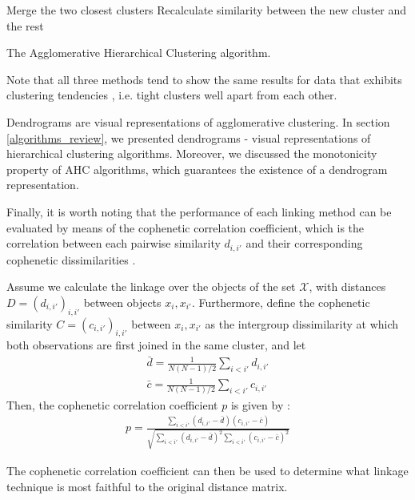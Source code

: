 \documentclass[../main.tex]{subfiles}
\begin{document}
\begin{algorithm}
\begin{algorithmic}[1]
\Repeat
\State Merge the two closest clusters
\State Recalculate similarity between the new cluster and the rest
\EndFunction
\caption{The Agglomerative Hierarchical Clustering algorithm.}\label{alg_ahc}
\end{algorithmic}
\end{algorithm}
\par Note that all three methods tend to show the same results for data that exhibits clustering tendencies \cite{hastie2008}, i.e. tight clusters well apart from each other.
\par Dendrograms are visual representations of agglomerative clustering. In section \ref{algorithms_review}, we presented dendrograms - visual representations of hierarchical clustering algorithms. Moreover, we discussed the monotonicity property of AHC algorithms, which guarantees the existence of a dendrogram representation.
\par Finally, it is worth noting that the performance of each linking method can be evaluated by means of the cophenetic correlation coefficient, which is the correlation between each pairwise similarity $d_{i,i'}$ and their corresponding cophenetic dissimilarities \cite{hastie2008}. 
\par Assume we calculate the linkage over the objects of the set $\mathcal{X}$, with distances $D = (d_{i, i'})_{i, i'}$ between objects $x_i, x_{i'}$. Furthermore, define the cophenetic similarity $C = (c_{i,i'})_{i, i'}$ between $x_i, x_{i'}$ as the intergroup dissimilarity at which both observations are first joined in the same cluster, and let
\begin{align*}
\bar{d} = \frac{1}{N(N-1)/2}\sum_{i < i'} d_{i, i'}\\
\bar{c} = \frac{1}{N(N-1)/2}\sum_{i < i'} c_{i, i'}
\end{align*}
Then, the cophenetic correlation coefficient $p$ is given by \cite{Mathworks2015a}:
\begin{align*}
p = \frac{\sum_{i < i'}(d_{i, i'} - \bar{d})(c_{i, i'} - \bar{c})}{\sqrt{\sum_{i < i'}(d_{i, i'} - \bar{d})^2\sum_{i < i'}(c_{i,i'} - \bar{c})^2}}
\end{align*}
\par The cophenetic correlation coefficient can then be used to determine what linkage technique is most faithful to the original distance matrix.
\end{document}

